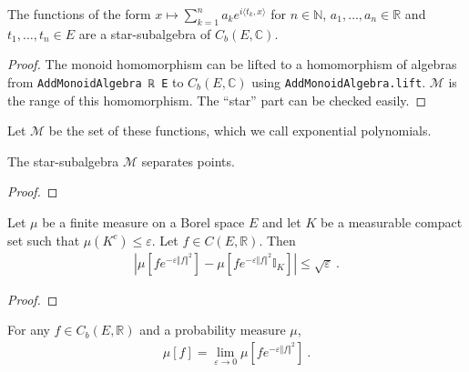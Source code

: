 \begin{lemma}\label{lem:starSubalgebra_expPoly}
\mathlibok
{}
The functions of the form $x \mapsto \sum_{k=1}^n a_k e^{i\langle t_k, x\rangle}$ for $n \in \mathbb{N}$, $a_1, \ldots, a_n \in \mathbb{R}$ and $t_1, \ldots, t_n \in E$ are a star-subalgebra of $C_b(E, \mathbb{C})$. 
\end{lemma}

\begin{proof} \leanok
The monoid homomorphism can be lifted to a homomorphism of algebras from \texttt{AddMonoidAlgebra ℝ E} to $C_b(E, \mathbb{C})$ using \texttt{AddMonoidAlgebra.lift}. $\mathcal M$ is the range of this homomorphism. The ``star'' part can be checked easily.
\end{proof}


Let $\mathcal M$ be the set of these functions, which we call exponential polynomials.

\begin{lemma}\label{lem:separates_points_expPoly}
\mathlibok
{}
The star-subalgebra $\mathcal M$ separates points.
\end{lemma}

\begin{proof}\leanok
\end{proof}


\begin{lemma}\label{lem:integral_restrict_compact}
\mathlibok
{}
Let $\mu$ be a finite measure on a Borel space $E$ and let $K$ be a measurable compact set such that $\mu(K^c) \le \varepsilon$. Let $f \in C(E, \mathbb{R})$. Then
\begin{align*}
\left\vert \mu[fe^{-\varepsilon \Vert f \Vert^2}] - \mu[f e^{-\varepsilon \Vert f \Vert^2} \mathbb{I}_K] \right\vert
\le \sqrt{\varepsilon} \: .
\end{align*}
\end{lemma}

\begin{proof}\leanok
\end{proof}


\begin{lemma}\label{lem:introduce_exponential}
\mathlibok
{}
For any $f \in C_b(E, \mathbb{R})$ and a probability measure $\mu$,
\begin{align*}
\mu[f] 
= \lim_{\varepsilon \to 0} \mu\left[f e^{-\varepsilon \Vert f \Vert^2} \right]
\: .
\end{align*}
\end{lemma}

